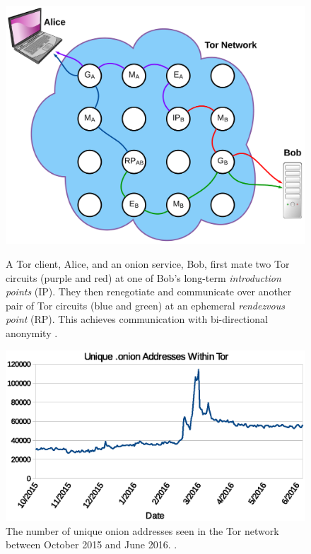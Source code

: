 \documentclass[USenglish,oneside,twocolumn]{article}
\begin{document}
\begin{figure}[t!] %
	\centering
	\includegraphics[width=0.8\linewidth]{../assets/images/LucidCharts/Hidden_Services.pdf}
	\caption{A Tor client, Alice, and an onion service, Bob, first mate two Tor circuits (purple and red) at one of Bob's long-term \emph{introduction points} (IP). They then renegotiate and communicate over another pair of Tor circuits (blue and green) at an ephemeral \emph{rendezvous point} (RP). This achieves communication with bi-directional anonymity \cite{overlier2006locating}.}
	\label{fig:OnionCommunication}
	
	\hspace{5px}
	
	\includegraphics[width=0.85\linewidth]{../assets/images/Tor/unique_addresses.eps}
	\caption{The number of unique onion addresses seen in the Tor network between October 2015 and June 2016. \cite{TorMetrics}.}
	\label{fig:OnionCount}
	\vspace{-3px}
	
\end{figure}
\end{document}
